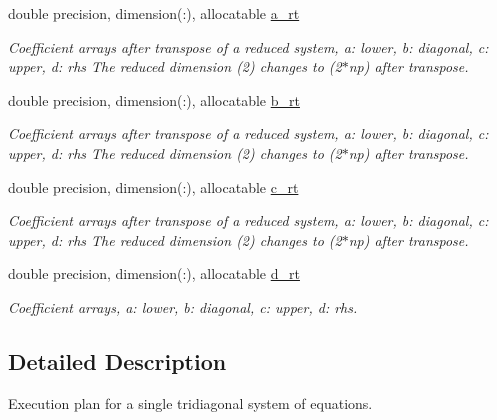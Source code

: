 \textbf{ }\par
\begin{DoxyCompactItemize}
\item 
double precision, dimension(\+:), allocatable \mbox{\hyperlink{structmodule__stdma_1_1stdma__plan__single_aa1f44d6faeaee89e6648a91accb05b1c}{a\+\_\+rt}}
\begin{DoxyCompactList}\small\item\em Coefficient arrays after transpose of a reduced system, a\+: lower, b\+: diagonal, c\+: upper, d\+: rhs The reduced dimension (2) changes to (2$\ast$np) after transpose. \end{DoxyCompactList}\item 
double precision, dimension(\+:), allocatable \mbox{\hyperlink{structmodule__stdma_1_1stdma__plan__single_aee41c7a5aaa557626e4bff5705d0094f}{b\+\_\+rt}}
\begin{DoxyCompactList}\small\item\em Coefficient arrays after transpose of a reduced system, a\+: lower, b\+: diagonal, c\+: upper, d\+: rhs The reduced dimension (2) changes to (2$\ast$np) after transpose. \end{DoxyCompactList}\item 
double precision, dimension(\+:), allocatable \mbox{\hyperlink{structmodule__stdma_1_1stdma__plan__single_a9e2d3358d1a4aee945f9520f022221a7}{c\+\_\+rt}}
\begin{DoxyCompactList}\small\item\em Coefficient arrays after transpose of a reduced system, a\+: lower, b\+: diagonal, c\+: upper, d\+: rhs The reduced dimension (2) changes to (2$\ast$np) after transpose. \end{DoxyCompactList}\item 
double precision, dimension(\+:), allocatable \mbox{\hyperlink{structmodule__stdma_1_1stdma__plan__single_ac331eacd911644f8bb2e257cb09baa9d}{d\+\_\+rt}}
\begin{DoxyCompactList}\small\item\em Coefficient arrays, a\+: lower, b\+: diagonal, c\+: upper, d\+: rhs. \end{DoxyCompactList}\end{DoxyCompactItemize}



\subsection{Detailed Description}
Execution plan for a single tridiagonal system of equations. 

